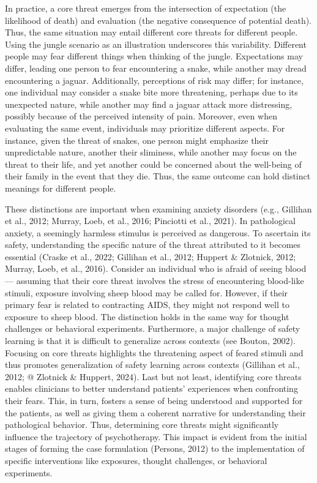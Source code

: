 \documentclass[
  man,floatsintext]{apa7}
\begin{document}
In practice, a core threat emerges from the intersection of expectation (the likelihood of death) and evaluation (the negative consequence of potential death).
Thus, the same situation may entail different core threats for different people.
Using the jungle scenario as an illustration underscores this variability.
Different people may fear different things when thinking of the jungle.
Expectations may differ, leading one person to fear encountering a snake, while another may dread encountering a jaguar.
Additionally, perceptions of risk may differ; for instance, one individual may consider a snake bite more threatening, perhaps due to its unexpected nature, while another may find a jaguar attack more distressing, possibly because of the perceived intensity of pain.
Moreover, even when evaluating the same event, individuals may prioritize different aspects.
For instance, given the threat of snakes, one person might emphasize their unpredictable nature, another their sliminess, while another may focus on the threat to their life, and yet another could be concerned about the well-being of their family in the event that they die.
Thus, the same outcome can hold distinct meanings for different people.

These distinctions are important when examining anxiety disorders (e.g., Gillihan et al., 2012; Murray, Loeb, et al., 2016; Pinciotti et al., 2021).
In pathological anxiety, a seemingly harmless stimulus is perceived as dangerous.
To ascertain its safety, understanding the specific nature of the threat attributed to it becomes essential (Craske et al., 2022; Gillihan et al., 2012; Huppert \& Zlotnick, 2012; Murray, Loeb, et al., 2016).
Consider an individual who is afraid of seeing blood--- assuming that their core threat involves the stress of encountering blood-like stimuli, exposure involving sheep blood may be called for.
However, if their primary fear is related to contracting AIDS, they might not respond well to exposure to sheep blood.
The distinction holds in the same way for thought challenges or behavioral experiments.
Furthermore, a major challenge of safety learning is that it is difficult to generalize across contexts (see Bouton, 2002).
Focusing on core threats highlights the threatening aspect of feared stimuli and thus promotes generalization of safety learning across contexts (Gillihan et al., 2012; @ Zlotnick \& Huppert, 2024).
Last but not least, identifying core threats enables clinicians to better understand patients' experiences when confronting their fears.
This, in turn, fosters a sense of being understood and supported for the patients, as well as giving them a coherent narrative for understanding their pathological behavior.
Thus, determining core threats might significantly influence the trajectory of psychotherapy.
This impact is evident from the initial stages of forming the case formulation (Persons, 2012) to the implementation of specific interventions like exposures, thought challenges, or behavioral experiments.
\end{document}
